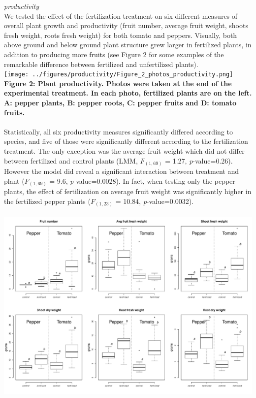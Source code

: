 \documentclass[11pt,]{article}
\begin{document}
\emph{productivity}\\
We tested the effect of the fertilization treatment on six different
measures of overall plant growth and productivity (fruit number, average
fruit weight, shoots fresh weight, roots fresh weight) for both tomato
and peppers. Visually, both above ground and below ground plant
structure grew larger in fertilized plants, in addition to producing
more fruits (see Figure 2 for some examples of the remarkable difference
between fertilized and unfertilized plants). ~\\
\texttt{[image: ../figures/productivity/Figure\_2\_photos\_productivity.png]}\\
\textbf{Figure 2: Plant productivity. Photos were taken at the end of
the experimental treatment. In each photo, fertilized plants are on the
left. A: pepper plants, B: pepper roots, C: pepper fruits and D: tomato
fruits.}\\
\hspace*{0.333em}\\
Statistically, all six productivity measures significantly differed
according to species, and five of those were significantly different
according to the fertilization treatment. The only exception was the
average fruit weight which did not differ between fertilized and control
plants (LMM, \(F_{(1,69)}\) = 1.27, \emph{p}-value=0.26). However the
model did reveal a significant interaction between treatment and plant
(\(F_{(1,69)}\) = 9.6, \emph{p}-value=0.0028). In fact, when testing
only the pepper plants, the effect of fertilization on average fruit
weight was significantly higher in the fertilized pepper plants
(\(F_{(1,23)}\) = 10.84, \emph{p}-value=0.0032).\\
\hspace*{0.333em}\\
\includegraphics[width=6.25000in]{../figures/productivity/Figure_3_productivity.pdf}\\
\end{document}
